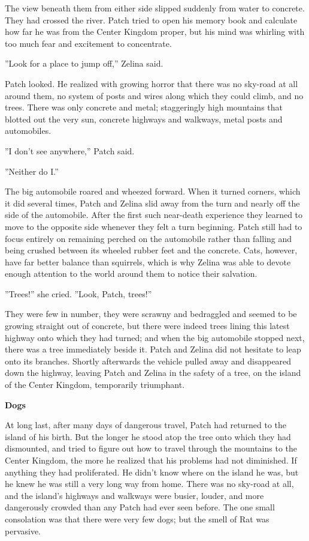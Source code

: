 \documentclass[11pt]{article}
\begin{document}
The view beneath them from either side slipped suddenly from water to concrete. They had crossed the river. Patch tried to open his memory book and calculate how far he was from the Center Kingdom proper, but his mind was whirling with too much fear and excitement to concentrate.\par
 ''Look for a place to jump off,'' Zelina said.\par
 Patch looked. He realized with growing horror that there was no sky-road at all around them, no system of posts and wires along which they could climb, and no trees. There was only concrete and metal; staggeringly high mountains that blotted out the very sun, concrete highways and walkways, metal posts and automobiles.\par
 ''I don't see anywhere,'' Patch said.\par
 ''Neither do I.''\par
 The big automobile roared and wheezed forward. When it turned corners, which it did several times, Patch and Zelina slid away from the turn and nearly off the side of the automobile. After the first such near-death experience they learned to move to the opposite side whenever they felt a turn beginning. Patch still had to focus entirely on remaining perched on the automobile rather than falling and being crushed between its wheeled rubber feet and the concrete. Cats, however, have far better balance than squirrels, which is why Zelina was able to devote enough attention to the world around them to notice their salvation.\par
 ''Trees!'' she cried. ''Look, Patch, trees!''\par
 They were few in number, they were scrawny and bedraggled and seemed to be growing straight out of concrete, but there were indeed trees lining this latest highway onto which they had turned; and when the big automobile stopped next, there was a tree immediately beside it. Patch and Zelina did not hesitate to leap onto its branches. Shortly afterwards the vehicle pulled away and disappeared down the highway, leaving Patch and Zelina in the safety of a tree, on the island of the Center Kingdom, temporarily triumphant.\par
{}\par
{\bf Dogs\par
}\par
 At long last, after many days of dangerous travel, Patch had returned to the island of his birth. But the longer he stood atop the tree onto which they had dismounted, and tried to figure out how to travel through the mountains to the Center Kingdom, the more he realized that his problems had not diminished. If anything they had proliferated. He didn't know where on the island he was, but he knew he was still a very long way from home. There was no sky-road at all, and the island's highways and walkways were busier, louder, and more dangerously crowded than any Patch had ever seen before. The one small consolation was that there were very few dogs; but the smell of Rat was pervasive.\par
\end{document}
